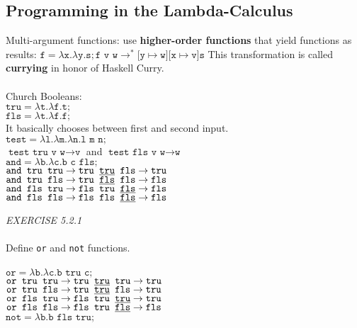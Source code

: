 \documentclass{article}
\begin{document}
\subsection{Programming in the Lambda-Calculus}
Multi-argument functions: use \textbf{higher-order functions} that yield functions as results: \(\texttt{f}=\lambda \texttt{x.}\lambda \texttt{y.s}; \texttt{f v w}\to^{*} \texttt{[y}\mapsto \texttt{w][x}\mapsto \texttt{v]s}\) This transformation is called \textbf{currying} in honor of Haskell Curry.\\\\
Church Booleans:\\
\(\texttt{tru}=\lambda \texttt{t.}\lambda \texttt{f.t;}\)\\
\(\texttt{fls}=\lambda \texttt{t.}\lambda \texttt{f.f;}\)\\
It basically chooses between first and second input.\\
\(\texttt{test}=\lambda \texttt{l.}\lambda \texttt{m.}\lambda \texttt{n.l m n;}\)\\
\(\texttt{test tru v w}\to \texttt{v}\) and \(\texttt{test fls v w}\to \texttt{w}\)\\
\(\texttt{and}=\lambda \texttt{b.}\lambda \texttt{c.b c fls;}\)\\
\null\qquad \(\texttt{and tru tru}\to \texttt{tru \underline{tru} fls}\to \texttt{tru}\)\\
\null\qquad \(\texttt{and tru fls}\to \texttt{tru \underline{fls} fls}\to \texttt{fls}\)\\
\null\qquad \(\texttt{and fls tru}\to \texttt{fls tru \underline{fls}}\to \texttt{fls}\)\\
\null\qquad \(\texttt{and fls fls}\to \texttt{fls fls \underline{fls}}\to \texttt{fls}\)\\
\begin{siderules}\color{blue}\textit{EXERCISE 5.2.1}\color{black}\\\\
\color{blue}Define \texttt{or} and \texttt{not} functions.\\\\\color{black}
\(\texttt{or}=\lambda \texttt{b.}\lambda \texttt{c.b tru c;}\)\\
\null\qquad \(\texttt{or tru tru}\to \texttt{tru \underline{tru} tru}\to \texttt{tru}\)\\
\null\qquad \(\texttt{or tru fls}\to \texttt{tru \underline{tru} fls}\to \texttt{tru}\)\\
\null\qquad \(\texttt{or fls tru}\to \texttt{fls tru \underline{tru}}\to \texttt{tru}\)\\
\null\qquad \(\texttt{or fls fls}\to \texttt{fls tru \underline{fls}}\to \texttt{fls}\)\\
\(\texttt{not}=\lambda \texttt{b.b fls tru;}\)
\end{siderules}
\end{document}
